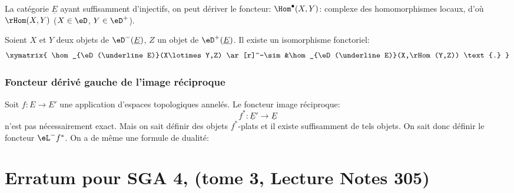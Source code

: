 La catégorie $\underline E$ ayant suffisamment d'injectifs, on peut 
dériver le foncteur: $\Hom^\bullet(X,Y)$: complexe des homomorphismes locaux,  
d'où $\rHom(X,Y)$ ($X\in \eD$, $Y\in \eD^+$). 

Soient $X$ et $Y$ deux objets de $\eD^-(\underline E)$, $Z$ un objet de 
$\eD^+(\underline E)$. Il existe un isomorphisme fonctoriel: 
\[\xymatrix{
  \hom_{\eD(\underline E)}(X\lotimes Y,Z) \ar[r]^-\sim 
    &\hom_{\eD(\underline E)}(X,\rHom(Y,Z)) \text{.}
}\]










\subsection{Foncteur dérivé gauche de l'image réciproque}\label{VIII:6-3}

Soit $f:E\to E'$ une application d'espaces topologiques annelés. Le 
foncteur image réciproque: 
\[
  f^\ast:\underline{E}' \to \underline E 
\]
n'est pas nécessairement exact. Mais on sait définir des objets 
$f^\ast$-plats et il existe suffisamment de tels objets. On sait donc 
définir le foncteur $\eL^- f^\ast$. On a de même une formule de dualité: 




















\appendix
\chapter{Erratum pour SGA 4, (tome 3, Lecture Notes 305)}\label{ErratumSGA4}

